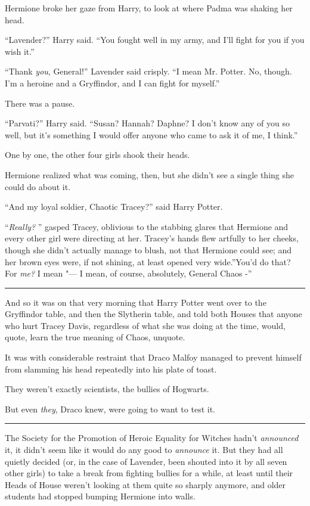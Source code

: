 Hermione broke her gaze from Harry, to look at where Padma was shaking
her head.

``Lavender?'' Harry said. ``You fought well in my army, and I'll fight
for you if you wish it.''

``Thank \emph{you}, General!'' Lavender said crisply. ``I mean Mr.
Potter. No, though. I'm a heroine and a Gryffindor, and I can fight for
myself.''

There was a pause.

``Parvati?'' Harry said. ``Susan? Hannah? Daphne? I don't know any of
you so well, but it's something I would offer anyone who came to ask it
of me, I think.''

One by one, the other four girls shook their heads.

Hermione realized what was coming, then, but she didn't see a single
thing she could do about it.

``And my loyal soldier, Chaotic Tracey?'' said Harry Potter.

``\emph{Really?} '' gasped Tracey, oblivious to the stabbing glares that
Hermione and every other girl were directing at her. Tracey's hands flew
artfully to her cheeks, though she didn't actually manage to blush, not
that Hermione could see; and her brown eyes were, if not shining, at
least opened very wide.''You'd do that? For \emph{me?} I mean "--- I mean,
of course, absolutely, General Chaos -''

\begin{center}\rule{3in}{0.4pt}\end{center}

And so it was on that very morning that Harry Potter went over to the
Gryffindor table, and then the Slytherin table, and told both Houses
that anyone who hurt Tracey Davis, regardless of what she was doing at
the time, would, quote, learn the true meaning of Chaos, unquote.

It was with considerable restraint that Draco Malfoy managed to prevent
himself from slamming his head repeatedly into his plate of toast.

They weren't exactly scientists, the bullies of Hogwarts.

But even \emph{they}, Draco knew, were going to want to test it.

\begin{center}\rule{3in}{0.4pt}\end{center}

The Society for the Promotion of Heroic Equality for Witches hadn't
\emph{announced} it, it didn't seem like it would do any good to
\emph{announce} it. But they had all quietly decided (or, in the case of
Lavender, been shouted into it by all seven other girls) to take a break
from fighting bullies for a while, at least until their Heads of House
weren't looking at them quite so sharply anymore, and older students had
stopped bumping Hermione into walls.

